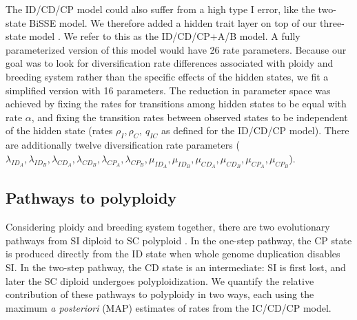 The ID/CD/CP model could also suffer from a high type I error, like the two-state BiSSE model. 
We therefore added a hidden trait layer on top of our three-state model \citep[analogous to][]{caetano_2018,  huang_2018}.
We refer to this as the ID/CD/CP+A/B model.
A fully parameterized version of this model would have 26 rate parameters. 
Because our goal was to look for diversification rate differences associated with ploidy and breeding system rather than the specific effects of the hidden states, we fit a simplified version with 16 parameters. %
The reduction in parameter space was achieved by fixing the rates for transitions among hidden states to be equal with rate $\alpha$, and fixing the transition rates between observed states to be independent of the hidden state (rates $\rho_I,\rho_C,\ q_{IC}$ as defined for the ID/CD/CP model).
There are additionally twelve diversification rate parameters ($\lambda_{ID_A},  \lambda_{ID_B},  \lambda_{CD_A}, \lambda_{CD_B}, \lambda_{CP_A}, \lambda_{CP_B}, \mu_{ID_A}, \mu_{ID_B}, \mu_{CD_A}, \mu_{CD_B},  \mu_{CP_A}, \mu_{CP_B}$).

\subsection{Pathways to polyploidy}

Considering ploidy and breeding system together, there are two evolutionary pathways from SI diploid to SC polyploid \citep{brunet2001, robertson_2011}.
In the one-step pathway, the CP state is produced directly from the ID state when whole genome duplication disables SI.
In the two-step pathway, the CD state is an intermediate: SI is first lost, and later the SC diploid undergoes polyploidization.
We quantify the relative contribution of these pathways to polyploidy in two ways, each using the maximum \textit{a posteriori} (MAP) estimates of rates from the IC/CD/CP model.

